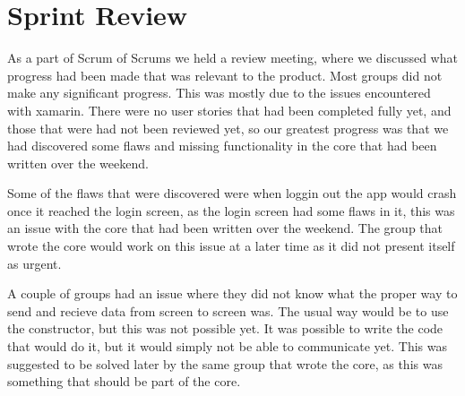 \section{Sprint Review}
As a part of Scrum of Scrums we held a review meeting, where we discussed what progress had been made that was relevant to the product.
Most groups did not make any significant progress.
This was mostly due to the issues encountered with xamarin.
There were no user stories that had been completed fully yet, and those that were had not been reviewed yet, so our greatest progress was that we had discovered some flaws and missing functionality in the core that had been written over the weekend.

Some of the flaws that were discovered were when loggin out the app would crash once it reached the login screen, as the login screen had some flaws in it, this was an issue with the core that had been written over the weekend.
The group that wrote the core would work on this issue at a later time as it did not present itself as urgent.

A couple of groups had an issue where they did not know what the proper way to send and recieve data from screen to screen was.
The usual way would be to use the constructor, but this was not possible yet.
It was possible to write the code that would do it, but it would simply not be able to communicate yet.
This was suggested to be solved later by the same group that wrote the core, as this was something that should be part of the core.
